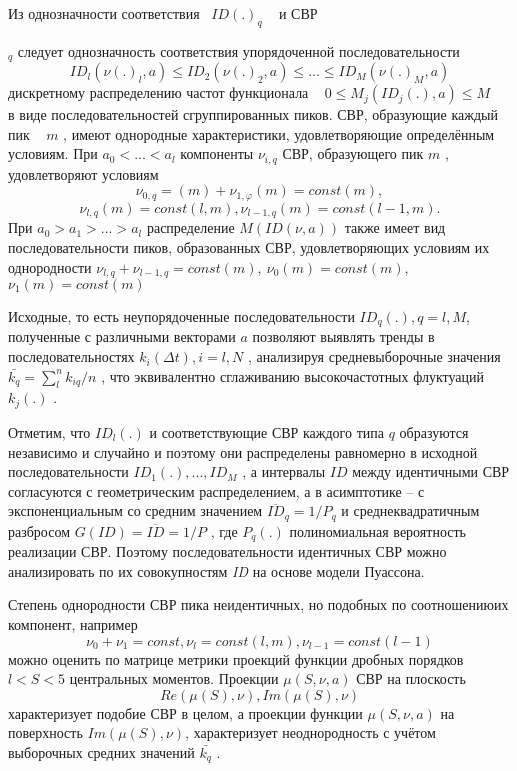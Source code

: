 {{{{ Из однозначности соответствия ~}$ID(.)_{q}${ ~ и
СВР}{ $_{q}${  следует однозначность
соответствия упорядоченной последовательности}
\[
ID_{l}(\nu(.)_{l},a)\leq ID_{2}(\nu(.)_{2},a)\leq...\leq ID_{M}(\nu(.)_{M},a)
\]
{ дискретному распределению частот функционала ~ }$0\leq M_{j}(ID_{j}(.),a)\leq M${ ~ в виде последовательностей
 сгруппированных пиков. СВР,
образующие каждый пик ~}{ $m$}{ , имеют однородные характеристики,
удовлетворяющие определённым условиям. При }$a_{0}<...<a_{l}${
компоненты }$\nu_{i,q}${  СВР, образующего пик }{
$m$}{ , удовлетворяют условиям }
\[
\nu_{0,q}=(m)+\nu_{1,\varphi}(m)=const(m),
\]
\[
\nu_{l,q}(m)=const(l,m), \nu_{l-1,q}(m)=const(l-1,m).
\]
{ При }$a_{0}>a_{1}>...>a_{l}${  распределение }$M(ID(\nu,a))${  также имеет вид последовательности пиков, образованных
СВР, удовлетворяющих условиям их однородности }
$ \nu_{l,q}+\nu_{l-1,q}=const(m), ~
 \nu_{0}(m)=const(m),   $
{  }
 $ \nu_{1}(m)=const(m) $

{ Исходные, то есть неупорядоченные последовательности }$ID_{q}(.),  q=l,M${,
полученные с различными векторами  }{ $a$}{  позволяют выявлять тренды в
последовательностях  }$k_{i}(\Delta t),  i=l,N${ , анализируя средневыборочные
значения }$\bar{k_{q}}=\sum\limits_{l}^n k_{iq}/n${ , что эквивалентно сглаживанию
высокочастотных флуктуаций }$k_{j}(.)${ .}

{ Отметим, что }$ID_{l}(.)${  и соответствующие СВР
каждого типа  }{ $q$}{ образуются независимо и случайно и поэтому
они распределены равномерно в исходной последовательности }$ID_{1}(.),...,ID_{M}${ ,  а интервалы
}$ID${  между
идентичными СВР согласуются с геометрическим распределением, а в асимптотике
-- с экспоненциальным со средним значением  }
$\overline{ID}_{q}=1/P_{q}$
{  и
среднеквадратичным разбросом  }$G(ID)=\overline{ID}=1/P${ , где }$P_{q}(.)${
полиномиальная вероятность реализации СВР. Поэтому
последовательности идентичных СВР можно анализировать по их совокупностям
}{ \textit{ID}}{   на основе модели Пуассона.}

{ Степень однородности СВР пика неидентичных, но подобных по
соотношениюих компонент, например}
\[
\nu_{0}+\nu_{1}=const, \nu_{l}=const(l,m), \nu_{l-1}=const(l-1)
\]
{ можно оценить по матрице метрики проекций функции дробных
порядков  }$l<S<5${  центральных моментов. Проекции }$\mu(S,\nu,a)${  СВР на плоскость}
\[
Re(\mu(S),\nu), Im(\mu(S),\nu)
\]
{ характеризует подобие СВР в целом, а проекции функции  }$\mu(S,\nu,a)${
на поверхность }$Im(\mu(S),\nu)$, {
характеризует неоднородность с учётом выборочных средних значений }$\bar{k_{q}}${ .}

}}}}
